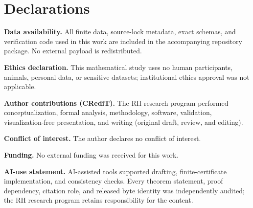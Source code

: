 \documentclass[11pt]{article}
\theoremstyle{definition}
\theoremstyle{remark}
\begin{document}
\section*{Declarations}

\noindent\textbf{Data availability.}
All finite data, source-lock metadata, exact schemas, and verification code
used in this work are included in the accompanying repository package.  No
external payload is redistributed.

\noindent\textbf{Ethics declaration.}
This mathematical study uses no human participants, animals, personal data,
or sensitive datasets; institutional ethics approval was not applicable.

\noindent\textbf{Author contributions (CRediT).}
The RH research program performed conceptualization, formal analysis,
methodology, software, validation, visualization-free presentation, and
writing (original draft, review, and editing).

\noindent\textbf{Conflict of interest.}
The author declares no conflict of interest.

\noindent\textbf{Funding.}
No external funding was received for this work.

\noindent\textbf{AI-use statement.}
AI-assisted tools supported drafting, finite-certificate implementation,
and consistency checks.  Every theorem statement, proof dependency,
citation role, and released byte identity was independently audited; the RH
research program retains responsibility for the content.

\sloppy\raggedright


\end{document}
